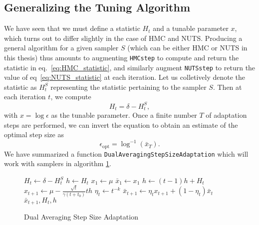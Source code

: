 \subsection{Generalizing the Tuning Algorithm}
We have seen that we must define a statistic $H_t$ and a tunable parameter $x$, which turns out to differ slightly in the case of HMC and NUTS. Producing a general algorithm for a given sampler $S$ (which can be either HMC or NUTS in this thesis) thus amounts to augmenting {\tt HMCstep} to compute and return the statistic in eq.~\eqref{eq:HMC_statistic}, and similarly augment {\tt NUTSstep} to return the value of eq~\eqref{eq:NUTS_statistic} at each iteration. Let us colletively denote the statistic as $H_t^S$ representing the statistic pertaining to the sampler $S$. Then at each iteration $t$, we compute
\begin{equation}
    H_t = \delta - H_t^S,
\end{equation} 
with $x = \log \epsilon$ as the tunable parameter. Once a finite number $T$ of adaptation steps are performed, we can invert the equation to obtain an estimate of the optimal step size as
\begin{equation}
    \epsilon_\text{opt} = \log^{-1}(\bar{x}_T).
\end{equation} 
We have summarized a function {\tt DualAveragingStepSizeAdaptation} which will work with samplers in algorithm \ref{algo:dual_step_size_adaptation}.

\begin{figure}[H]
	\begin{algorithm}[H]
	\caption{Dual Averaging Step Size Adaptation}\label{algo:dual_step_size_adaptation}
	\begin{algorithmic}
            \State $H_t \gets \delta - H_t^S$
                \State $h \gets H_t$
                \State $x_{1} \gets \mu$
                \State $\bar{x}_{1} \gets x_1$
            \Else
                \State $h \gets (t-1)h + H_t$ 
                \State $x_{t+1} \gets \mu - \frac{\sqrt{t}}{\gamma(t + t_0)}th$ 
                \State $\eta_t \gets t^{-k}$
                \State $\bar{x}_{t+1} \gets \eta_t x_{t+1} + (1 - \eta_t)\bar{x}_t$ 
            \EndIf
            \State \Return $\bar{x}_{t+1}, H_t, h$
        \EndFunction
	\end{algorithmic}
	\end{algorithm}
\end{figure}
